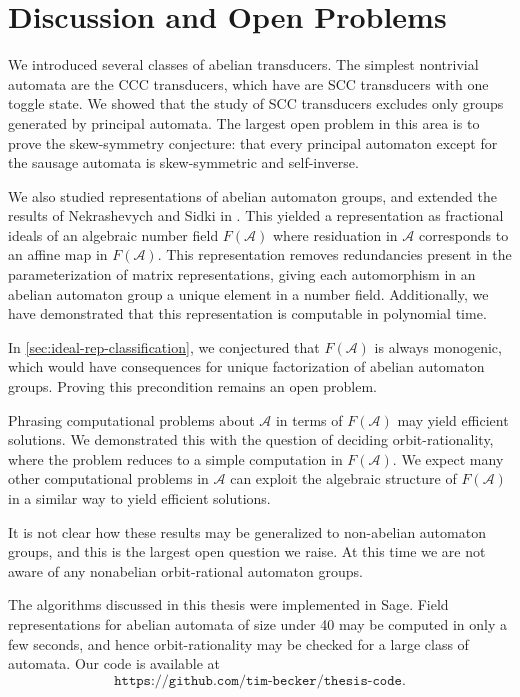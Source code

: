 \documentclass[12pt, letterpaper]{article}
\newcommand{\A}{\mathcal A}
\newcommand{\codeurl}{\texttt{https://github.com/tim-becker/thesis-code}}
\begin{document}
\pagebreak
\section{Discussion and Open Problems}

We introduced several classes of abelian transducers. The simplest nontrivial
automata are the CCC transducers, which have are SCC transducers with
one toggle state. We showed that the study of SCC transducers excludes only
groups generated by principal automata. The largest open problem in this area
is to prove the skew-symmetry conjecture: that every principal automaton
except for the sausage automata is skew-symmetric and self-inverse.

We also studied representations of abelian automaton groups, and extended the
results of Nekrashevych and Sidki in \cite{nekrashevych2004automorphisms}.
This yielded a representation as fractional ideals of an algebraic number field
$F(\A)$ where residuation in $\A$ corresponds to an affine map in $F(\A)$. This
representation removes redundancies present in the parameterization of matrix
representations, giving each automorphism in an abelian automaton group a
unique element in a number field. Additionally, we have demonstrated that this
representation is computable in polynomial time.

In \cref{sec:ideal-rep-classification}, we conjectured that $F(\A)$ is always
monogenic, which would have consequences for unique factorization of abelian
automaton groups. Proving this precondition remains an open problem.

Phrasing computational problems about $\A$ in terms of $F(\A)$ may yield
efficient solutions. We demonstrated this with the question of deciding
orbit-rationality, where the problem reduces to a simple computation in
$F(\A)$. We expect many other computational problems in $\A$ can exploit the
algebraic structure of $F(\A)$ in a similar way to yield efficient solutions.

It is not clear how these results may be generalized to non-abelian automaton
groups, and this is the largest open question we raise. At this time we are
not aware of any nonabelian orbit-rational automaton groups.

The algorithms discussed in this thesis were implemented in Sage. Field
representations for abelian automata of size under 40 may be computed in only a
few seconds, and hence orbit-rationality may be checked for a large class of
automata. Our code is available at
\[
    \codeurl.
\]

\printbibliography
\end{document}
